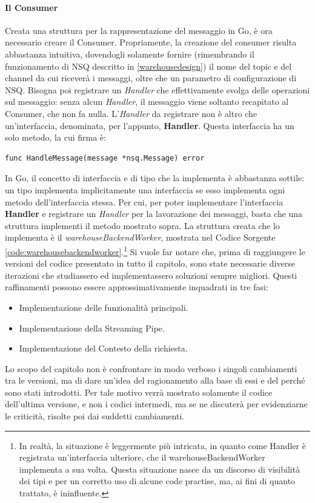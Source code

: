\paragraph{Il Consumer}
Creata una struttura per la rappresentazione del messaggio in Go, è ora necessario creare il Consumer. Propriamente, la creazione del consumer risulta abbastanza intuitiva, dovendogli solamente fornire (rimembrando il funzionamento di NSQ descritto in \ref{warehousedesign}) il nome del topic e del channel da cui riceverà i messaggi, oltre che un parametro di configurazione di NSQ. Bisogna poi registrare un \textit{Handler} che effettivamente svolga delle operazioni sul messaggio: senza alcun \textit{Handler}, il messaggio viene soltanto recapitato al Consumer, che non fa nulla. L'\textit{Handler} da registrare non è altro che un'interfaccia, denominata, per l'appunto, \textbf{Handler}. Questa interfaccia ha un solo metodo, la cui firma è:
\begin{verbatim}
func HandleMessage(message *nsq.Message) error
\end{verbatim}
In Go, il concetto di interfaccia e di tipo che la implementa è abbastanza sottile: un tipo implementa implicitamente una interfaccia se esso implementa ogni metodo dell'interfaccia stessa. Per cui, per poter implementare l'interfaccia \textbf{Handler} e registrare un \textit{Handler} per la lavorazione dei messaggi, basta che una struttura implementi il metodo mostrato sopra. La struttura creata che lo implementa è il \textit{warehouseBackendWorker}, mostrata nel Codice Sorgente \ref{code:warehousebackendworker}.\footnote{In realtà, la situazione è leggermente più intricata, in quanto come Handler è registrata un'interfaccia ulteriore, che il warehouseBackendWorker implementa a sua volta. Questa situazione nasce da un discorso di visibilità dei tipi e per un corretto uso di alcune code practise, ma, ai fini di quanto trattato, è ininfluente.}
Si vuole far notare che, prima di raggiungere le versioni del codice presentato in tutto il capitolo, sono state necessarie diverse iterazioni che studiassero ed implementassero soluzioni sempre migliori. Questi raffinamenti possono essere approssimativamente inquadrati in tre fasi: 
\begin{itemize}
    \item Implementazione delle funzionalità principali.
    \item Implementazione della Streaming Pipe.
    \item Implementazione del Contesto della richiesta.
\end{itemize}
Lo scopo del capitolo non è confrontare in modo verboso i singoli cambiamenti tra le versioni, ma di dare un'idea del ragionamento alla base di essi e del perché sono stati introdotti. Per tale motivo verrà mostrato solamente il codice dell'ultima versione, e non i codici intermedi, ma se ne discuterà per evidenziarne le criticità, risolte poi dai suddetti cambiamenti. 

